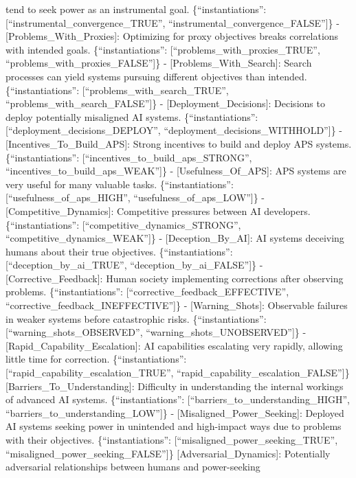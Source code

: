 \documentclass[
  11pt,
  letterpaper,
]{book}
\begin{document}
tend to seek power as an instrumental goal. \{``instantiations'':
{[}``instrumental\_convergence\_TRUE'',
``instrumental\_convergence\_FALSE''{]}\} -
{[}Problems\_With\_Proxies{]}: Optimizing for proxy objectives breaks
correlations with intended goals. \{``instantiations'':
{[}``problems\_with\_proxies\_TRUE'',
``problems\_with\_proxies\_FALSE''{]}\} - {[}Problems\_With\_Search{]}:
Search processes can yield systems pursuing different objectives than
intended. \{``instantiations'': {[}``problems\_with\_search\_TRUE'',
``problems\_with\_search\_FALSE''{]}\} - {[}Deployment\_Decisions{]}:
Decisions to deploy potentially misaligned AI systems.
\{``instantiations'': {[}``deployment\_decisions\_DEPLOY'',
``deployment\_decisions\_WITHHOLD''{]}\} -
{[}Incentives\_To\_Build\_APS{]}: Strong incentives to build and deploy
APS systems. \{``instantiations'':
{[}``incentives\_to\_build\_aps\_STRONG'',
``incentives\_to\_build\_aps\_WEAK''{]}\} - {[}Usefulness\_Of\_APS{]}:
APS systems are very useful for many valuable tasks.
\{``instantiations'': {[}``usefulness\_of\_aps\_HIGH'',
``usefulness\_of\_aps\_LOW''{]}\} - {[}Competitive\_Dynamics{]}:
Competitive pressures between AI developers. \{``instantiations'':
{[}``competitive\_dynamics\_STRONG'',
``competitive\_dynamics\_WEAK''{]}\} - {[}Deception\_By\_AI{]}: AI
systems deceiving humans about their true objectives.
\{``instantiations'': {[}``deception\_by\_ai\_TRUE'',
``deception\_by\_ai\_FALSE''{]}\} - {[}Corrective\_Feedback{]}: Human
society implementing corrections after observing problems.
\{``instantiations'': {[}``corrective\_feedback\_EFFECTIVE'',
``corrective\_feedback\_INEFFECTIVE''{]}\} - {[}Warning\_Shots{]}:
Observable failures in weaker systems before catastrophic risks.
\{``instantiations'': {[}``warning\_shots\_OBSERVED'',
``warning\_shots\_UNOBSERVED''{]}\} -
{[}Rapid\_Capability\_Escalation{]}: AI capabilities escalating very
rapidly, allowing little time for correction. \{``instantiations'':
{[}``rapid\_capability\_escalation\_TRUE'',
``rapid\_capability\_escalation\_FALSE''{]}\}
{[}Barriers\_To\_Understanding{]}: Difficulty in understanding the
internal workings of advanced AI systems. \{``instantiations'':
{[}``barriers\_to\_understanding\_HIGH'',
``barriers\_to\_understanding\_LOW''{]}\} -
{[}Misaligned\_Power\_Seeking{]}: Deployed AI systems seeking power in
unintended and high-impact ways due to problems with their objectives.
\{``instantiations'': {[}``misaligned\_power\_seeking\_TRUE'',
``misaligned\_power\_seeking\_FALSE''{]}\} {[}Adversarial\_Dynamics{]}:
Potentially adversarial relationships between humans and power-seeking
\end{document}
